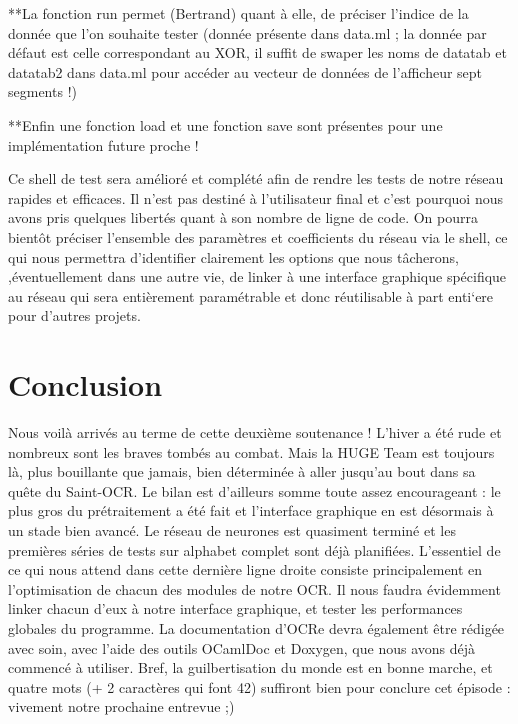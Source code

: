 \documentclass[a4paper,10pt]{report}
\begin{document}
**La fonction run permet (Bertrand) quant \`a elle, de pr\'eciser l'indice de la donn\'ee
que l'on souhaite tester (donn\'ee pr\'esente dans data.ml ; la donn\'ee
par d\'efaut est celle correspondant au XOR, il suffit de swaper les
noms de datatab et datatab2 dans data.ml pour acc\'eder au vecteur de
donn\'ees de l'afficheur sept segments !)

**Enfin une fonction load et une fonction save sont pr\'esentes pour une
impl\'ementation future proche !


Ce shell de test sera am\'elior\'e et compl\'et\'e afin de rendre les
tests de notre r\'eseau rapides et efficaces. Il n'est pas destin\'e \`a
l'utilisateur final et c'est pourquoi nous avons pris quelques
libert\'es quant \`a son nombre de ligne de code.
On pourra bient\^ot pr\'eciser l'ensemble des param\`etres et
coefficients du r\'eseau via le shell, ce qui nous permettra
d'identifier clairement les options que nous t\^acherons,
,\'eventuellement dans une autre vie, de linker \`a une interface graphique
sp\'ecifique au r\'eseau qui sera enti\`erement param\'etrable et donc
r\'eutilisable \`a part enti`ere pour d'autres projets.


\chapter{Conclusion} %
\label{cha:conclusion}

Nous voil\`a arriv\'es au terme de cette deuxi\`eme soutenance ! L'hiver
a \'et\'e rude et nombreux sont les braves tomb\'es au combat. Mais la HUGE Team est
toujours l\`a, plus bouillante que jamais, bien d\'etermin\'ee \`a aller
jusqu'au bout dans sa qu\^ete du Saint-OCR. 
Le bilan est d'ailleurs somme toute assez encourageant : le plus gros du
pr\'etraitement a \'et\'e fait et l'interface graphique en est
d\'esormais \`a un stade bien avanc\'e. Le r\'eseau de neurones est
quasiment termin\'e et les premi\`eres s\'eries de tests sur alphabet
complet sont d\'ej\`a planifi\'ees. L'essentiel de ce qui nous attend
dans cette derni\`ere ligne droite consiste principalement en
l'optimisation de chacun des modules de notre OCR. Il nous faudra \'evidemment linker
chacun d'eux \`a notre interface graphique, et tester les performances
globales du programme. La documentation d'OCRe devra \'egalement \^etre
r\'edig\'ee avec soin, avec l'aide des outils OCamlDoc et Doxygen, que
nous avons d\'ej\`a commenc\'e \`a utiliser. Bref, la guilbertisation du
monde est en bonne marche, et quatre mots (+ 2 caract\`eres qui font 42) suffiront bien pour conclure
cet épisode : vivement notre prochaine entrevue ;)

\end{document}
